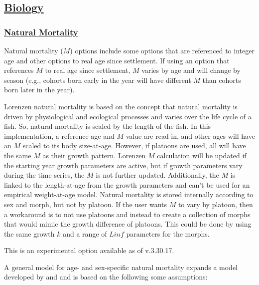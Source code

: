 \hypertarget{Biology}{}
\subsection[Biology]{\protect\hyperlink{Biology}{Biology}}
\hypertarget{NatM}{}
\subsubsection[Natural Mortality]{\protect\hyperlink{NatM}{Natural Mortality}}
Natural mortality ($M$) options include some options that are referenced to integer age and other options to real age since settlement. If using an option that references $M$ to real age since settlement, $M$ varies by age and will change by season (e.g., cohorts born early in the year will have different $M$ than cohorts born later in the year).

Lorenzen natural mortality is based on the concept that natural mortality is driven by physiological and ecological processes and varies over the life cycle of a fish. So, natural mortality is scaled by the length of the fish. In this implementation, a reference age and $M$ value are read in, and other ages will have an $M$ scaled to its body size-at-age. However, if platoons are used, all will have the same $M$ as their growth pattern. Lorenzen $M$ calculation will be updated if the starting year growth parameters are active, but if growth parameters vary during the time series, the $M$ is not further updated. Additionally, the $M$ is linked to the length-at-age from the growth parameters and can't be used for an empirical weight-at-age model. Natural mortality is stored internally according to sex and morph, but not by platoon. If the user wants $M$ to vary by platoon, then a workaround is to not use platoons and instead to create a collection of morphs that would mimic the growth difference of platoons. This could be done by using the same growth $k$ and a range of $Linf$ parameters for the morphs.


This is an experimental option available as of v.3.30.17. 

A general model for age- and sex-specific natural mortality expands a model developed by \citet{maunder2010bigeye} and \citet{maunder2011M} and is based on the following some assumptions:


